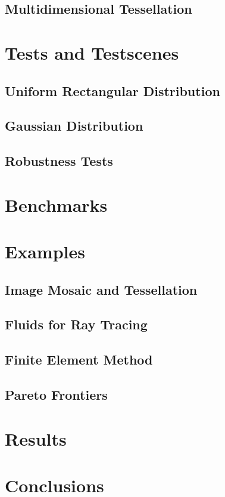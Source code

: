 \documentclass[10pt, twoside, fleqn]{article}
\let\oldsection\section
\renewcommand*\section{%
  \cleardoublepage
  \thispagestyle{sectionstyle}\oldsection}
\begin{document}
    \subsection{Multidimensional Tessellation}
  \section{Tests and Testscenes}
    \subsection{Uniform Rectangular Distribution}
    \subsection{Gaussian Distribution}
    \subsection{Robustness Tests}
  \section{Benchmarks}
  \section{Examples}
    \subsection{Image Mosaic and Tessellation}
    \subsection{Fluids for Ray Tracing}
    \subsection{Finite Element Method}
    \subsection{Pareto Frontiers}
  \section{Results}
  \section{Conclusions}

  \nocite{*}
  \printbibliography[heading=bibintoc]
\end{document}
